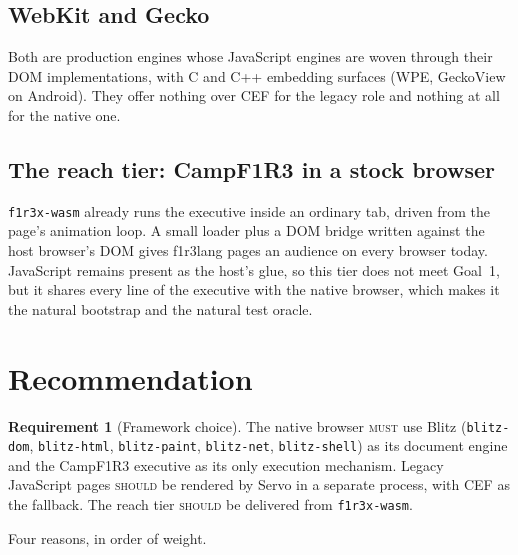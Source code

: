\documentclass[11pt]{article}
\theoremstyle{definition}
\newtheorem{requirement}{Requirement}
\theoremstyle{remark}
\newcommand{\fl}{f1r3lang}
\newcommand{\Camp}{CampF1R3}
\newcommand{\MUST}{\textsc{must}}
\newcommand{\SHOULD}{\textsc{should}}
\newcommand{\code}[1]{\texttt{#1}}
\begin{document}
\subsection{WebKit and Gecko}
Both are production engines whose JavaScript engines are woven through their DOM
implementations, with C and C++ embedding surfaces (WPE, GeckoView on Android). They
offer nothing over CEF for the legacy role and nothing at all for the native one.

\subsection{The reach tier: \Camp{} in a stock browser}
\code{f1r3x-wasm} already runs the executive inside an ordinary tab, driven from the
page's animation loop. A small loader plus a DOM bridge written against the host
browser's DOM gives \fl{} pages an audience on every browser today. JavaScript
remains present as the host's glue, so this tier does not meet Goal~1, but it shares
every line of the executive with the native browser, which makes it the natural
bootstrap and the natural test oracle.

\section{Recommendation}\label{sec:rec}

\begin{requirement}[Framework choice]
The native browser \MUST{} use Blitz (\code{blitz-dom}, \code{blitz-html},
\code{blitz-paint}, \code{blitz-net}, \code{blitz-shell}) as its document engine and
the \Camp{} executive as its only execution mechanism. Legacy JavaScript pages
\SHOULD{} be rendered by Servo in a separate process, with CEF as the fallback. The
reach tier \SHOULD{} be delivered from \code{f1r3x-wasm}.
\end{requirement}

\noindent
Four reasons, in order of weight.
\end{document}
